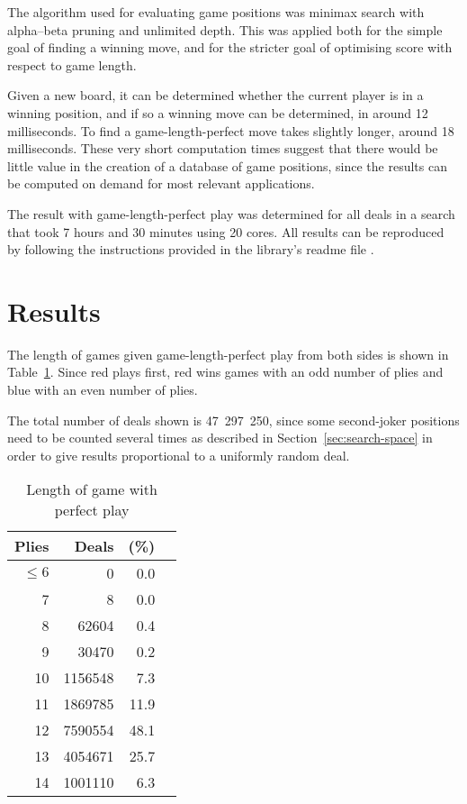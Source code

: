 \documentclass[a4paper, twocolumn]{article}
\begin{document}
The algorithm used for evaluating game positions was minimax search with
alpha--beta pruning and unlimited depth. This was applied both for the simple
goal of finding a winning move, and for the stricter goal of optimising score
with respect to game length.

Given a new board, it can be determined whether the current player is in a
winning position, and if so a winning move can be determined, in around 12
milliseconds. To find a game-length-perfect move takes slightly longer, around
18 milliseconds. These very
short computation times suggest that there would be little value in the creation
of a database of game positions, since the results can be computed on demand for
most relevant applications.

The result with game-length-perfect play was determined for all deals in a
search that took 7 hours and 30 minutes using 20 cores. All results can be
reproduced by following the instructions provided in the library's readme file
\cite{github}.


\section{Results}

The length of games given game-length-perfect play from both sides is shown in
Table~\ref{tab:game-length}. Since red plays first, red wins games with an odd
number of plies and blue with an even number of plies.

The total number of deals shown is 47~297~250, since some second-joker positions
need to be counted several times as described in Section~\ref{sec:search-space}
in order to give results proportional to a uniformly random deal.

\begin{table}[ht]
  \centering
  \begin{tabular}{r r r c}
    \hline
    \textbf{Plies} & \textbf{Deals} & \textbf{(\%)} \\
    \hline
    $\leq 6$ & 0 & 0.0 \\
    7 & 8 & 0.0 \\
    8 & 62604 & 0.4 \\
    9 & 30470 & 0.2 \\
    10 & 1156548 & 7.3 \\
    11 & 1869785 & 11.9 \\
    12 & 7590554 & 48.1 \\
    13 & 4054671 & 25.7 \\
    14 & 1001110 & 6.3 \\
    \hline
  \end{tabular}
  \caption{Length of game with perfect play}
  \label{tab:game-length}
\end{table}
\end{document}
